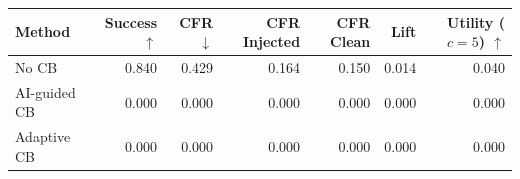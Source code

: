\begin{tabular}{lrrrrrr}
\toprule
Method & Success $\uparrow$ & CFR $\downarrow$ & CFR Injected & CFR Clean & Lift & Utility ($c=5$) $\uparrow$ \\
\midrule
No CB & 0.840 & 0.429 & 0.164 & 0.150 & 0.014 & 0.040 \\
AI-guided CB & 0.000 & 0.000 & 0.000 & 0.000 & 0.000 & 0.000 \\
Adaptive CB & 0.000 & 0.000 & 0.000 & 0.000 & 0.000 & 0.000 \\
\bottomrule
\end{tabular}
